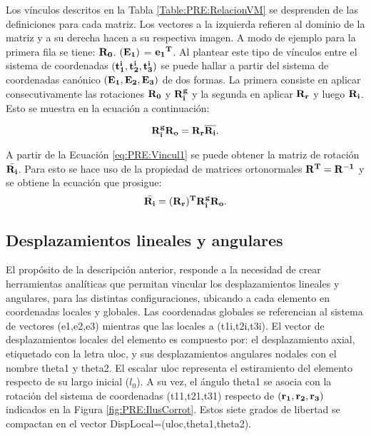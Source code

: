 Los vínculos descritos en la Tabla \ref{Table:PRE:RelacionVM} se desprenden de las definiciones para cada matriz. Los vectores a la izquierda refieren al dominio de la matriz y a su derecha hacen a su respectiva imagen. A modo de ejemplo para la primera fila se tiene: $\bf{R}_0$. $(\bf{E_1})$ = $\bf{e_1}^T$. Al plantear este tipo de vínculos entre el sistema de coordenadas $(\bf{t_1^i},\bf{t_2^i},\bf{t_3^i})$ se puede hallar a partir del sistema de coordenadas canónico $(\bf{E_1},\bf{E_2},\bf{E_3})$ de dos formas. La primera consiste en aplicar consecutivamente las rotaciones $\bf{R}_0$ y $\bf{R}_i^g$ y la segunda en aplicar $\bf{R_r}$ y luego ${\bf{R_i}}$. Esto se muestra en la ecuación a continuación: 

\begin{equation}
	\label{eq:PRE:Vincul1}
	\bf{R_i^g}\bf{R_o}= \bf{R_r}\overline{\bf{R_i}}.
\end{equation}

A partir de la Ecuación \eqref{eq:PRE:Vincul1} se puede obtener la matriz de rotación $\bar{\bf{R_i}}$. Para esto se hace uso de la propiedad de matrices ortonormales $\bf{R}^T=\bf{R}^{-1}$ y se obtiene la ecuación que prosigue: 
\begin{equation}
	\label{eq:PRE:Vincul2}
	\bar{\bf{R_i}}=(\bf{R_r})^T\bf{R_i^g}\bf{R_o}.\\
\end{equation}


\subsection{Desplazamientos lineales y angulares}

El propósito de la descripción anterior, responde a la necesidad de crear herramientas analíticas que permitan vincular los desplazamientos lineales y angulares, para las distintas configuraciones, ubicando a cada elemento en coordenadas locales y globales. Las coordenadas globales se referencian al sistema de vectores (\gls{e1},\gls{e2},\gls{e3}) mientras que las locales a (\gls{t1i},\gls{t2i},\gls{t3i}). El vector de desplazamientos locales del elemento es compuesto por: el desplazamiento axial, etiquetado con la letra \gls{uloc}, y sus desplazamientos angulares nodales con el nombre \gls{theta1} y \gls{theta2}. El escalar \gls{uloc} representa el estiramiento del elemento respecto de su largo inicial ($l_0$). A su vez, el ángulo \gls{theta1} se asocia con la rotación del sistema de coordenadas (\gls{t11},\gls{t21},\gls{t31}) respecto de $(\bf{r_1},\bf{r_2},\bf{r_3})$ indicados en la Figura \ref{fig:PRE:IlusCorrot}. Estos siete grados de libertad se compactan en el vector \gls{DispLocal}=(\gls{uloc},\gls{theta1},\gls{theta2}). 


